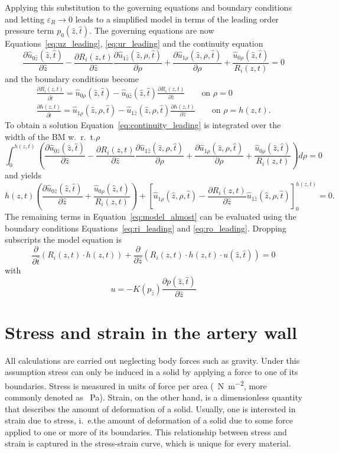 \documentclass{frontiers_suppmat} %
\newcommand{\beq}{\begin{equation}}
\newcommand{\eeq}{\end{equation}}
\newcommand{\dd}{\partial}
\newcommand{\vareps}{\varepsilon}
\newcommand{\ra}{\rightarrow}
\newcommand{\hatz}{\hat{z}}
\newcommand{\hatt}{\hat{t}}
\newcommand{\wrt}{w.~r.~t.}
\newcommand{\ie}{i.~e.}
\begin{document}
Applying this substitution to the governing equations and boundary conditions and letting $\vareps_R \ra 0$ leads to a simplified model in terms of the leading order pressure term $p_0(\hatz,\hatt)$. The governing equations are now Equations~\ref{eq:uz_leading}, \ref{eq:ur_leading} and the continuity equation
\beq
\frac{\dd \hat{u}_{0\hatz}(\hatz,\hatt)}{\dd \hatz} - \frac{\dd R_i(z,t)}{\dd \hatz} \frac{\dd \hat{u}_{1\hatz}(\hatz,\rho,\hatt)}{\dd \rho} + \frac{\dd \hat{u}_{1\rho}(\hatz,\rho,\hatt)}{\dd \rho} + \frac{\hat{u}_{0\rho}(\hatz,\hatt)}{R_i(z,t)} = 0\label{eq:continuity_leading}
\eeq
and the boundary conditions become
\begin{gather}
\frac{\dd R_i(z,t)}{\dd \hatt} = \hat{u}_{0\rho}(\hatz,\hatt) - \hat{u}_{0\hatz}(\hatz,\hatt) \frac{\dd R_i(z,t)}{\dd \hatz} \qquad \text{on } \rho = 0\label{eq:ri_leading}\\
\frac{\dd h(z,t)}{\dd \hatt} = \hat{u}_{1\rho}(\hatz,\rho,\hatt) - \hat{u}_{1\hatz}(\hatz,\rho,\hatt) \frac{\dd h(z,t)}{\dd \hatz} \qquad \text{on } \rho = h(z,t)\label{eq:ro_leading}.
\end{gather} 
To obtain a solution Equation~\ref{eq:continuity_leading} is integrated over the width of the BM \wrt $\rho$
\[
\int_0^{h(z,t)} \left( \frac{\dd \hat{u}_{0\hatz}(\hatz,\hatt)}{\dd \hatz} - \frac{\dd R_i(z,t)}{\dd \hatz} \frac{\dd \hat{u}_{1\hatz}(\hatz,\rho,\hatt)}{\dd \rho} + \frac{\dd \hat{u}_{1\rho}(\hatz,\rho,\hatt)}{\dd \rho} + \frac{\hat{u}_{0\rho}(\hatz,\hatt)}{R_i(z,t)} \right) d\rho = 0
\]
and yields
\beq
h(z,t) \left( \frac{\dd \hat{u}_{0\hatz}(\hatz,\hatt)}{\dd \hatz} + \frac{\hat{u}_{0\rho}(\hatz,\hatt)}{R_i(z,t)} \right) + \left[ \hat{u}_{1\rho}(\hatz,\rho,\hatt) - \frac{\dd R_i(z,t)}{\dd \hatz} \hat{u}_{1\hatz}(\hatz,\rho,\hatt) \right]_0^{h(z,t)} = 0.\label{eq:model_almost}
\eeq
The remaining terms in Equation~\ref{eq:model_almost} can be evaluated using the boundary conditions Equations~\ref{eq:ri_leading} and \ref{eq:ro_leading}. Dropping subscripts the model equation is 
\beq
\frac{\dd}{\dd \hatt} \left( R_i(z,t) \cdot h(z,t) \right) + \frac{\dd}{\dd \hatz} \left( R_i(z,t) \cdot h(z,t) \cdot u(\hatz,\hatt) \right) = 0
\eeq
with 
\[
u = -K(p_{\hatz}) \frac{\dd p(\hatz,\hatt)}{\dd \hatz}
\]

\section{Stress and strain in the artery wall}

All calculations are carried out neglecting body forces such as gravity. Under this assumption stress can only be induced in a solid by applying a force to one of its boundaries. Stress is measured in units of force per area (\SI{}{\newton\per\square\metre}, more commonly denoted as \SI{}{\pascal}). Strain, on the other hand, is a dimensionless quantity that describes the amount of deformation of a solid. Usually, one is interested in strain due to stress, \ie the amount of deformation of a solid due to some force applied to one or more of its boundaries. This relationship between stress and strain is captured in the stress-strain curve, which is unique for every material.
\end{document}
